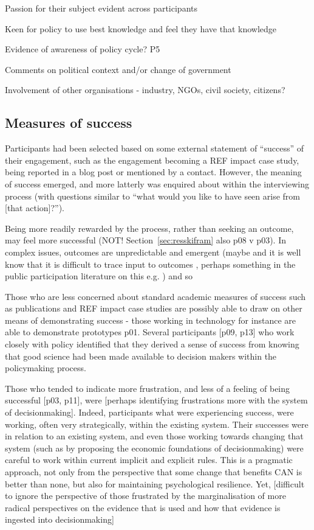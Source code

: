 Passion for their subject evident across participants

Keen for policy to use best knowledge and feel they have that knowledge

Evidence of awareness of policy cycle? P5

Comments on political context and/or change of government

Involvement of other organisations - industry, NGOs, civil society, citizens?
\subsection{Measures of success}
Participants had been selected based on some external statement of ``success'' of their engagement, such as the engagement becoming a REF impact case study, being reported in a blog post or mentioned by a contact. However, the meaning of success emerged, and more latterly was enquired about within the interviewing process (with questions similar to ``what would you like to have seen arise from [that action]?'').

Being more readily rewarded by the process, rather than seeking an outcome, may feel more successful (NOT! Section~\ref{sec:resskifram} also p08 v p03). In complex issues, outcomes are unpredictable and emergent (maybe \cite{SnowdenB2007} and it is well know that it is difficult to trace input to outcomes \cite{BednarekSHG2015}, perhaps something in the public participation literature on this e.g. \cite{Sprain2016}) and so 

Those who are less concerned about standard academic measures of success such as publications and REF impact case studies are possibly able to draw on other means of demonstrating success - those working in technology for instance are able to demonstrate prototypes p01. Several participants [p09, p13] who work closely with policy identified that they derived a sense of success from knowing that good science had been made available to decision makers within the policymaking process.

Those who tended to indicate more frustration, and less of a feeling of being successful [p03, p11], were [perhaps identifying frustrations more with the system of decisionmaking]. Indeed, participants what were experiencing success, were working, often very strategically, within the existing system. Their successes were in relation to an existing system, and even those working towards changing that system (such as by proposing the economic foundations of decisionmaking) were careful to work within current implicit and explicit rules. This is a pragmatic approach, not only from the perspective that some change that benefits CAN is better than none, but also for maintaining psychological resilience. Yet, [difficult to ignore the perspective of those frustrated by the marginalisation of more radical perspectives on the evidence that is used and how that evidence is ingested into decisionmaking]  

